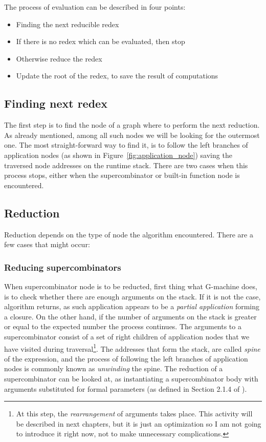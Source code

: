 \documentclass[12pt,a4paper]{report}
\begin{document}
The process of evaluation can be described in four points:

\begin{itemize}
  \item Finding the next reducible redex
  \item If there is no redex which can be evaluated, then stop
  \item Otherwise reduce the redex
  \item Update the root of the redex, to save the result of computations
\end{itemize}

\subsection{Finding next redex}
The first step is to find the node of a graph where to perform the next
reduction. As already mentioned, among all such nodes we will be looking for the
outermost one. The most straight-forward way to find it, is to follow the left
branches of application nodes (as shown in Figure~\ref{fig:application_node})
saving the traversed node addresses on the runtime stack. There are two cases
when this process stops, either when the supercombinator or built-in function
node is encountered.

\subsection{Reduction}
Reduction depends on the type of node the algorithm encountered. There are a
few cases that might occur:

\subsubsection{Reducing supercombinators}
When supercombinator node is to be reducted, first thing what G-machine does,
is to check whether there are enough arguments on the stack. If it is not the
case, algorithm returns, as such application appears to be a \textit{partial
application} forming a closure. On the other hand, if the number of arguments
on the stack is greater or equal to the expected number the process continues.
The arguments to a supercombinator consist of a set of right children of
application nodes that we have visited during traversal\footnote{At this step,
the \textit{rearrangement} of arguments takes place. This activity will be
described in next chapters, but it is just an optimization so I am not going to
introduce it right now, not to make unnecessary complications.}. The addresses
that form the stack, are called \textit{spine} of the expression, and the
process of following the left branches of application nodes is commonly known
as \textit{unwinding} the spine. The reduction of a supercombinator can be
looked at, as instantiating a supercombinator body with arguments substituted
for formal parameters (as defined in Section 2.1.4 of \cite{JonLes00}).
\end{document}
